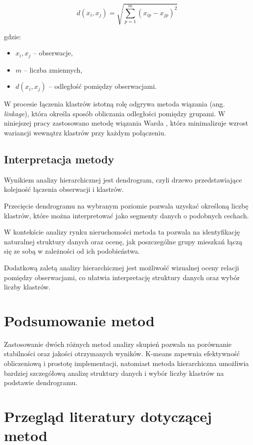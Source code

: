 \documentclass{report}
\begin{document}
\[
d(x_i, x_j) = \sqrt{\sum_{p=1}^{m} (x_{ip} - x_{jp})^2}
\]

gdzie:
\begin{itemize}
    \item \(x_i, x_j\) -- obserwacje,
    \item \(m\) -- liczba zmiennych,
    \item \(d(x_i, x_j)\) -- odległość pomiędzy obserwacjami.
\end{itemize}

W procesie łączenia klastrów istotną rolę odgrywa metoda wiązania (ang. \textit{linkage}), która określa sposób obliczania odległości pomiędzy grupami. W niniejszej pracy zastosowano metodę wiązania Warda \cite{ward1963}, która minimalizuje wzrost wariancji wewnątrz klastrów przy każdym połączeniu.

\subsection{Interpretacja metody}

Wynikiem analizy hierarchicznej jest dendrogram, czyli drzewo przedstawiające kolejność łączenia obserwacji i klastrów.

Przecięcie dendrogramu na wybranym poziomie pozwala uzyskać określoną liczbę klastrów, które można interpretować jako segmenty danych o podobnych cechach.

W kontekście analizy rynku nieruchomości metoda ta pozwala na identyfikację naturalnej struktury danych oraz ocenę, jak poszczególne grupy mieszkań łączą się ze sobą w zależności od ich podobieństwa.

Dodatkową zaletą analizy hierarchicznej jest możliwość wizualnej oceny relacji pomiędzy obserwacjami, co ułatwia interpretację struktury danych oraz wybór liczby klastrów.

\section{Podsumowanie metod}

Zastosowanie dwóch różnych metod analizy skupień pozwala na porównanie stabilności oraz jakości otrzymanych wyników. K-means zapewnia efektywność obliczeniową i prostotę implementacji, natomiast metoda hierarchiczna umożliwia bardziej szczegółową analizę struktury danych i wybór liczby klastrów na podstawie dendrogramu.

\section{Przegląd literatury dotyczącej metod}
\end{document}
